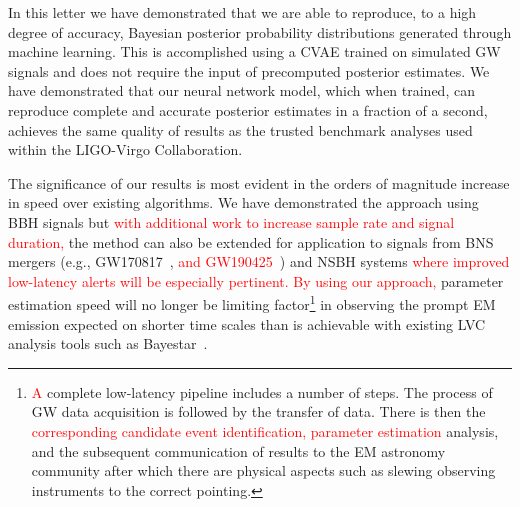 \documentclass[%
showpacs,
nofootinbib,
 amsmath,amssymb,
 aps,
 twocolumn,
 prl,
 reprint,
floatfix,
]{revtex4-1}
\newcommand{\new}[1]{\textcolor{red}{#1}}
\begin{document}
%
%

%
%
%
In this letter we have demonstrated that we are able to reproduce, to a high
degree of accuracy, Bayesian posterior probability distributions generated
through machine learning. This is accomplished using a \ac{CVAE} trained on
simulated \ac{GW} signals and does not require the input of precomputed
posterior estimates. We have demonstrated that our neural network model, which
when trained, can reproduce complete and accurate posterior estimates in
a fraction of a second, achieves the same quality of results as the
trusted benchmark analyses used within the LIGO-Virgo Collaboration.

%
%
The significance of our results is most evident in the orders of magnitude
increase in speed over existing algorithms. We have demonstrated the approach
using \ac{BBH} signals but \new{with additional work to increase sample rate
and signal duration,} the method can also be extended for application to
signals from \ac{BNS} mergers (e.g., GW170817~\cite{PhysRevLett.119.161101},
\new{and GW190425~\cite{2020ApJ...892L...3A}}) and \ac{NSBH} systems \new{where
improved low-latency alerts will be especially pertinent.} \new{By using our
approach,} parameter estimation speed will no longer be limiting
factor\footnote{\new{A} complete low-latency pipeline includes a number of
steps. The process of \ac{GW} data acquisition is followed by the transfer of
data. There is then the \new{corresponding candidate event identification,
parameter estimation} analysis, and the subsequent communication of results to
the \ac{EM} astronomy community after which there are physical aspects such as
slewing observing instruments to the correct pointing.} in observing the prompt
\ac{EM} emission expected on shorter time scales than is achievable with
existing \ac{LVC} analysis tools such as Bayestar~\cite{2016PhRvD..93b4013S}.
\end{document}
